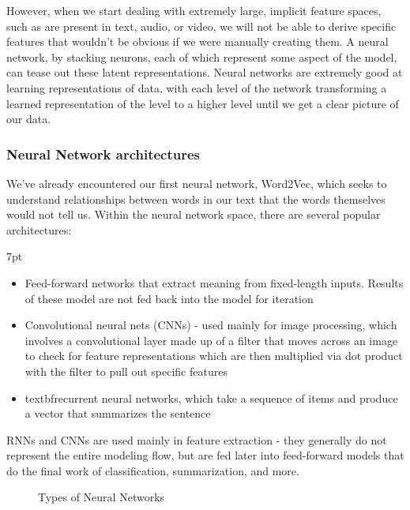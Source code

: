 \documentclass[11pt, table]{diazessay} %
\newenvironment{formal}{%
  \def\FrameCommand{%
	\hspace{1pt}%
	{\color{w_lightblue}\vrule width 2pt}%
	{\color{formalshade}\vrule width 4pt}%
	\colorbox{formalshade}%
  }%
  \MakeFramed{\advance\hsize-\width\FrameRestore}%
  \noindent\hspace{-4.55pt}%
  \begin{adjustwidth}{}{7pt}%
  \vspace{2pt}\vspace{2pt}%
}
{%
  \vspace{2pt}\end{adjustwidth}\endMakeFramed%
}
\begin{document}
\begin{sloppypar}
However, when we start dealing with extremely large, implicit feature spaces, such as are present in text, audio, or video, we will not be able to derive specific features that wouldn't be obvious if we were manually creating them. A neural network, by stacking neurons, each of which represent some aspect of the model, can tease out these latent representations. Neural networks are extremely good at learning representations of data, with each level of the network transforming a learned representation of the level to a higher level until we get a clear picture of our data\citep{lecun2015deep}.

\subsubsection{Neural Network architectures}

We've already encountered our first neural network, Word2Vec, which seeks to understand relationships between words in our text that the words themselves would not tell us. Within the neural network space, there are several popular architectures:

\begin{formal}
\begin{itemize}
  \item Feed-forward networks that extract meaning from fixed-length inputs. Results of these model are not fed back into the model for iteration
  \item Convolutional neural nets (CNNs) - used mainly for image processing, which involves a convolutional layer made up of a filter that moves across an image to check for feature representations which are then multiplied via dot product with the filter to pull out specific features
  \item textbf{recurrent neural networks}, which take a sequence of items and produce a vector that summarizes the sentence
\end{itemize}
\end{formal}

RNNs and CNNs are used mainly in feature extraction - they generally do not represent the entire modeling flow, but are fed later into feed-forward models that do the final work of classification, summarization, and more.

\begin{figure}[H]
\centering
{}
\caption{Types of Neural Networks}
\end{figure}



\end{sloppypar}
\end{document}
